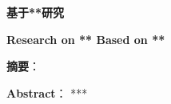 \begin{center}
{\sanhao \kaishu \bfseries 基于**研究}

{\sanhao \bfseries Research on ** Based on **}
\end{center}
\vskip -2mm


\textbf{摘要}：



\textbf{Abstract}：
***


\newpage